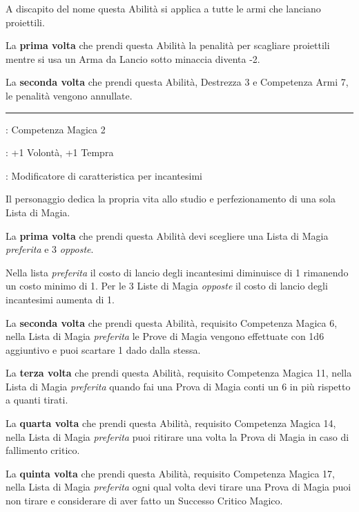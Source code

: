 \begin{multicols}{2}
A discapito del nome questa Abilità si applica a tutte le armi che lanciano proiettili.

La \textbf{prima volta} che prendi questa Abilità la penalità per scagliare proiettili mentre si usa un Arma da Lancio sotto minaccia diventa -2.

La \textbf{seconda volta} che prendi questa Abilità, Destrezza 3 e Competenza Armi 7, le penalità vengono annullate.

\smallskip\noindent\rule{\linewidth}{2pt} \hypertarget{Un solo credo}{}\medskip{}\label{Un solo credo}
\noindent
\begin{description}[noitemsep, topsep=0pt, parsep=0pt, partopsep=0pt, leftmargin=0cm, labelwidth=2.5cm]
    \item[\textbf{Requisito}]: Competenza Magica 2
    \item[\textbf{Tiri Salvezza}]: +1 Volontà, +1 Tempra
    \item[\textbf{Caratteristica}]: Modificatore di caratteristica per incantesimi
\end{description}

Il personaggio dedica la propria vita allo studio e perfezionamento di una sola Lista di Magia.

La \textbf{prima volta} che prendi questa Abilità devi scegliere una Lista di Magia \emph{preferita} e 3 \emph{opposte}.

Nella lista \emph{preferita} il costo di lancio degli incantesimi diminuisce di 1 rimanendo un costo minimo di 1. Per le 3 Liste di Magia \emph{opposte} il costo di lancio degli incantesimi aumenta di 1.

La \textbf{seconda volta} che prendi questa Abilità, requisito Competenza Magica 6, nella Lista di Magia \emph{preferita} le Prove di Magia vengono effettuate con 1d6 aggiuntivo e puoi scartare 1 dado dalla stessa.

La \textbf{terza volta} che prendi questa Abilità, requisito Competenza Magica 11, nella Lista di Magia \emph{preferita} quando fai una Prova di Magia conti un 6 in più rispetto a quanti tirati.

La \textbf{quarta volta} che prendi questa Abilità, requisito Competenza Magica 14, nella Lista di Magia \emph{preferita} puoi ritirare una volta la Prova di Magia in caso di fallimento critico.

La \textbf{quinta volta} che prendi questa Abilità, requisito Competenza Magica 17, nella Lista di Magia \emph{preferita} ogni qual volta devi tirare una Prova di Magia puoi non tirare e considerare di aver fatto un Successo Critico Magico.


\end{multicols}
